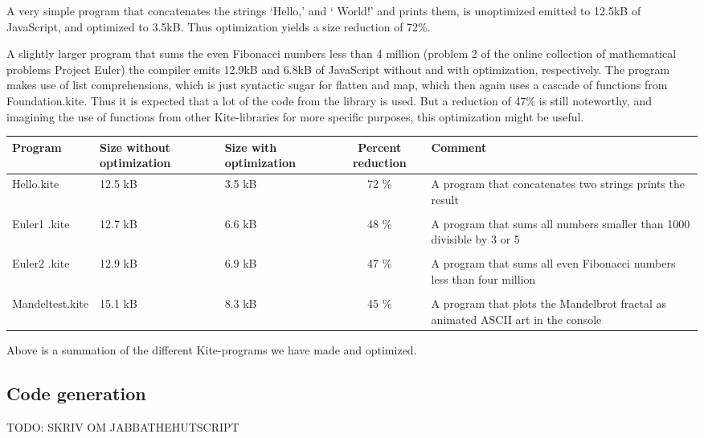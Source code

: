 A very simple program that concatenates the strings `Hello,' and ` World!' and prints them, is unoptimized emitted to 12.5kB of JavaScript, and optimized to 3.5kB. Thus optimization yields a size reduction of 72\%.

A slightly larger program that sums the even Fibonacci numbers less than 4 million (problem 2 of the online collection of mathematical problems Project Euler\cite{euler}) the compiler emits 12.9kB and 6.8kB of JavaScript without and with optimization, respectively. The program makes use of list comprehensions, which is just syntactic sugar for flatten and map, which then again uses a cascade of functions from Foundation.kite. Thus it is expected that a lot of the code from the library is used. But a reduction of 47\% is still noteworthy, and imagining the use of functions from other Kite-libraries for more specific purposes, this optimization might be useful.

\begin{center}
  \begin{tabulary}{0.9\textwidth}{|L| L |L| C | L | }
    \hline
    Program & Size without optimization & Size with optimization & Percent reduction & Comment \\
    \hline
    Hello.kite       & 12.5 kB & 3.5 kB & 72 \% & A program that concatenates two strings prints the result \\
    & & & & \\
    Euler1 .kite       & 12.7 kB & 6.6 kB & 48 \% & A program that sums all numbers smaller than 1000 divisible by 3 or 5 \\
    & & & & \\
    Euler2 .kite       & 12.9 kB & 6.9 kB & 47 \% & A program that sums all even Fibonacci numbers less than four million \\
    & & & & \\
    Mandeltest.kite       & 15.1 kB & 8.3 kB & 45 \% & A program that plots the Mandelbrot fractal as animated ASCII art in the console\\
    \hline
  \end{tabulary}

  Above is a summation of the different Kite-programs we have made and optimized.
\end{center}

\subsection{Code generation}
TODO: SKRIV OM JABBATHEHUTSCRIPT
